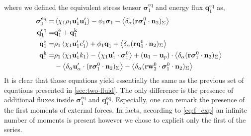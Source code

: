 where we defined the equivalent stress tensor $\bm{\sigma}_1^\text{eq}$ and energy flux $\textbf{q}^\text{eq}_1$ as,
\begin{align}
    \label{eq:sigma_eq_def}
    \bm{\sigma}_1^\text{eq}
    =& 
    \avg{\chi_1\rho_1\textbf{u}_1'\textbf{u}_1'}
    - \phi_1 \bm{\sigma}_1%
    - \pSavg{{\textbf{r}\bm{\sigma}_1^0 \cdot \textbf{n}_2}}\\
    \textbf{q}_1^\text{eq}
    =&\textbf{q}_1^\text{e} +\textbf{q}_1^\text{k}  \nonumber\\
    \textbf{q}_1^\text{e}
    =& \rho_1 \avg{\chi_1 \textbf{u}_1' e_1'} 
    + \phi_1\textbf{q}_1 
    +\pSavg{{\textbf{r}\textbf{q}_1^0 \cdot \textbf{n}_2}} 
    \nonumber\\
    \textbf{q}_1^\text{k}
    =& \rho_1 \avg{\chi_1 \textbf{u}_1' k_1} 
    - \avg{\chi_1 \textbf{u}_1' \cdot \bm{\sigma}_1^0}
    + (\textbf{u}_1 - \textbf{u}_p)\cdot
    \pSavg{{\textbf{r}\bm{\sigma}_1^0 \cdot \textbf{n}_2}}
    \nonumber\\\nonumber
    &- \pavg{ \textbf{u}_\alpha' \cdot \intS{ \textbf{r} \bm{\sigma}_1^0 \cdot \textbf{n}_2}}
    - \pavg{ \intS{\textbf{r}\textbf{w}_2^0 \cdot \bm{\sigma}_1^0 \cdot \textbf{n}_2}}
\end{align}
It is clear that those equations yield essentially the same as the previous set of equations presented in \ref{sec:two-fluid}.
The only difference is the presence of additional fluxes inside $\bm{\sigma}^\text{eq}_1$ and $\textbf{q}^\text{eq}_1$. 
Especially, one can remark the presence of the first moments of external forces. 
In facts, according to \ref{eq:f_exp} an infinite number of moments is present however we chose to explicit only the first of the series. 

